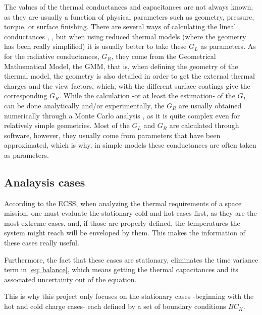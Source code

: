 The values of the thermal conductances and capacitances are not always known, as they are usually a function of physical parameters such as geometry, pressure, torque, or surface finishing. There are several ways of calculating the lineal conductances \cite{garmendia2016}, \cite{appel2004}, but when using reduced thermal models (where the geometry has been really simplified) it is usually better to take these $G_L$ as parameters. As for the radiative conductances, $G_R$, they come from the Geometrical Mathematical Model, the GMM, that is, when defining the geometry of the thermal model, the geometry is also detailed in order to get the external thermal charges and the view factors, which, with the different surface coatings give the corresponding $G_R$. While the calculation -or at least the estimation- of the $G_L$ can be done analytically and/or experimentally, the $G_R$ are usually obtained numerically through a Monte Carlo analysis \cite{planasalmazan1997}, as it is quite complex even for relatively simple geometries.  Most of the $G_L$ and $G_R$ are calculated through software, however, they usually come from parameters that have been approximated, which is why, in simple models these conductances are often taken as parameters.

\subsection{Analaysis cases}
According to the ECSS, when analyzing the thermal requirements of a space mission, one must evaluate the stationary cold and hot cases first, as they are the most extreme cases, and, if those are properly defined, the temperatures the system might reach will be enveloped by them. This makes the information of these cases really useful.

Furthermore, the fact that these cases are stationary, eliminates the time variance term in \autoref{eq: balance}, which means getting the thermal capacitances and its associated uncertainty out of the equation.

This is why this project only focuses on the stationary cases -beginning with the hot and cold charge cases- each defined by a set of boundary conditions $BC_K$.

